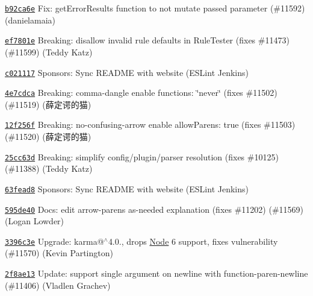 \begin{DoxyItemize}
\item \href{https://github.com/eslint/eslint/commit/b92ca6ea8ae46b92c258921e8b5b40f5035dbc43}{\texttt{ {\ttfamily b92ca6e}}} Fix\+: get\+Error\+Results function to not mutate passed parameter (\#11592) (danielamaia)
\item \href{https://github.com/eslint/eslint/commit/ef7801ea510e12a9ca4963bcc8ec7e3aacc75ff0}{\texttt{ {\ttfamily ef7801e}}} Breaking\+: disallow invalid rule defaults in Rule\+Tester (fixes \#11473) (\#11599) (Teddy Katz)
\item \href{https://github.com/eslint/eslint/commit/c021117915d5d23399233f761a237e138f1854af}{\texttt{ {\ttfamily c021117}}} Sponsors\+: Sync R\+E\+A\+D\+ME with website (E\+S\+Lint Jenkins)
\item \href{https://github.com/eslint/eslint/commit/4e7cdca571632a3f3c32b39eb03022fe88ca8b30}{\texttt{ {\ttfamily 4e7cdca}}} Breaking\+: comma-\/dangle enable functions\+: \char`\"{}never\char`\"{} (fixes \#11502) (\#11519) (薛定谔的猫)
\item \href{https://github.com/eslint/eslint/commit/12f256f22534c4a4e1ca0ba54c37c6db81441461}{\texttt{ {\ttfamily 12f256f}}} Breaking\+: no-\/confusing-\/arrow enable allow\+Parens\+: true (fixes \#11503) (\#11520) (薛定谔的猫)
\item \href{https://github.com/eslint/eslint/commit/25cc63d47e6c0aea8b88589a088c1f0de5f6f1cc}{\texttt{ {\ttfamily 25cc63d}}} Breaking\+: simplify config/plugin/parser resolution (fixes \#10125) (\#11388) (Teddy Katz)
\item \href{https://github.com/eslint/eslint/commit/63fead86f8cf4e6b33d5424fb7db1e76a66d4cce}{\texttt{ {\ttfamily 63fead8}}} Sponsors\+: Sync R\+E\+A\+D\+ME with website (E\+S\+Lint Jenkins)
\item \href{https://github.com/eslint/eslint/commit/595de4074fac1b5839f56b29fe0106a7fda7e3e0}{\texttt{ {\ttfamily 595de40}}} Docs\+: edit arrow-\/parens as-\/needed explanation (fixes \#11202) (\#11569) (Logan Lowder)
\item \href{https://github.com/eslint/eslint/commit/3396c3e2231b5b6e16da8751c22c86c256590f6b}{\texttt{ {\ttfamily 3396c3e}}} Upgrade\+: karma@$^\wedge$4.0., drops \mbox{\hyperlink{class_node}{Node}} 6 support, fixes vulnerability (\#11570) (Kevin Partington)
\item \href{https://github.com/eslint/eslint/commit/2f8ae1397eef3625fe66636e95b0b312c6ff8a37}{\texttt{ {\ttfamily 2f8ae13}}} Update\+: support single argument on newline with function-\/paren-\/newline (\#11406) (Vladlen Grachev)

\end{DoxyItemize}
